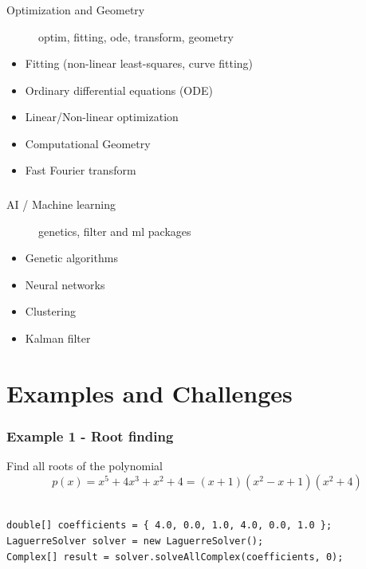 \documentclass[14pt,mathserif]{beamer}
\begin{document}
\begin{frame}
  \frametitle{}
  
\begin{description}
  \item[Optimization and Geometry] optim, fitting, ode, transform, geometry 
\end{description}

 \begin{small}
 \begin{itemize}
  \item Fitting (non-linear least-squares, curve fitting)
  \item Ordinary differential equations (ODE)
  \item Linear/Non-linear optimization
  \item Computational Geometry
  \item Fast Fourier transform
 \end{itemize}
\end{small}
\end{frame}

\begin{frame}
  \frametitle{}

\begin{description}
  \item[AI / Machine learning] genetics, filter and ml packages
\end{description}

\begin{small}
\begin{itemize}
  \item Genetic algorithms
  \item Neural networks
  \item Clustering
  \item Kalman filter
\end{itemize}
\end{small}
\end{frame}

\section[Examples]{Examples and Challenges}
\begin{frame}[fragile]
  \frametitle{Example 1 - Root finding}

\begin{small}
Find all roots of the polynomial \[p(x) = x^5 + 4x^3 + x^2 + 4 = (x+1)(x^2-x+1)(x^2+4)\]
\end{small}
\begin{verbatim}

double[] coefficients = { 4.0, 0.0, 1.0, 4.0, 0.0, 1.0 };
LaguerreSolver solver = new LaguerreSolver();
Complex[] result = solver.solveAllComplex(coefficients, 0);
\end{verbatim}
\end{frame}
\end{document}
